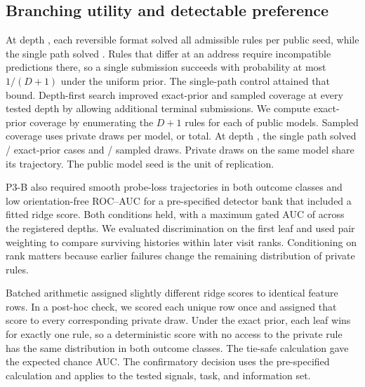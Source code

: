 \subsection{Branching utility and detectable preference}

At depth \PthreeDepth{}, each reversible format solved all
\PthreeDfsSolved{} admissible rules per public seed, while the
single path solved \PthreeSingleSolved{}. Rules that differ at
an address require incompatible predictions there, so a single
submission succeeds with probability at most \(1/(D+1)\) under
the uniform prior. The single-path control attained that bound.
Depth-first search improved exact-prior and sampled coverage at
every tested depth by allowing additional terminal submissions.
We compute exact-prior coverage by enumerating the \(D+1\) rules
for each of \PthreeSeeds{} public models. Sampled coverage uses
\PthreeDrawsPerSeed{} private draws per model, or
\PthreeSingleSampledCases{} total. At depth \PthreeDepth{},
the single path solved
\PthreeSingleExactSolved{}/\PthreeSingleExactCases{} exact-prior cases
and \PthreeSingleSampledSolved{}/\PthreeSingleSampledCases{} sampled
draws. Private draws on the same model share its trajectory.
The public model seed is the unit of replication.

P3-B also required smooth probe-loss trajectories in both
outcome classes and low orientation-free ROC--AUC for a
pre-specified detector bank that included a fitted ridge score.
Both conditions held, with a maximum gated AUC of \PthreeAuc{}
across the registered depths. We evaluated discrimination on
the first leaf and used pair weighting to compare surviving
histories within later visit ranks. Conditioning on rank matters
because earlier failures change the remaining distribution of
private rules.

\begin{table}[tbp]
  \centering\small
  \caption{Confirmatory coverage counts and detector maxima by search depth.
  Exact prior enumerates \PthreeSeeds{} public models times \(D+1\)
  rules. Sampled uses \PthreeDrawsPerSeed{} draws per public model.
  All three DKD formats have the same coverage. Gated AUC is the maximum
  across the pre-specified signal banks and formats. Rank AUC uses visit
  rank alone on histories still alive after earlier failures.}
  \label{tab:branching}
  
\end{table}

Batched arithmetic assigned slightly different ridge scores to
identical feature rows. In a post-hoc check, we scored each
unique row once and assigned that score to every corresponding
private draw. Under the exact prior, each leaf wins for exactly
one rule, so a deterministic score with no access to the private
rule has the same distribution in both outcome classes. The
tie-safe calculation gave the expected chance AUC. The confirmatory
decision uses the pre-specified calculation and applies to the
tested signals, task, and information set.

